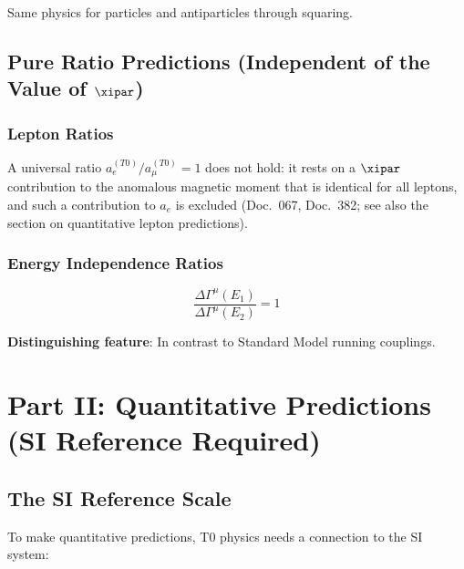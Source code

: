 	Same physics for particles and antiparticles through squaring.
	
	\subsection{Pure Ratio Predictions (Independent of the Value of $\xipar$)}
	
	\subsubsection{Lepton Ratios}
	
	A universal ratio $a_e^{(T0)}/a_{\mu}^{(T0)} = 1$ does not hold: it rests on a $\xipar$ contribution to the anomalous magnetic moment that is identical for all leptons, and such a contribution to $a_e$ is excluded (Doc.~067, Doc.~382; see also the section on quantitative lepton predictions).
	
	\subsubsection{Energy Independence Ratios}
	
	\begin{equation}
		\boxed{\frac{\Delta\Gamma^{\mu}(E_1)}{\Delta\Gamma^{\mu}(E_2)} = 1}
		\label{eq:energy_independence_ratio}
	\end{equation}
	
	\textbf{Distinguishing feature}: In contrast to Standard Model running couplings.
	
	\section{Part II: Quantitative Predictions (SI Reference Required)}
	
	\subsection{The SI Reference Scale}
	
	To make quantitative predictions, T0 physics needs a connection to the SI system:
	
